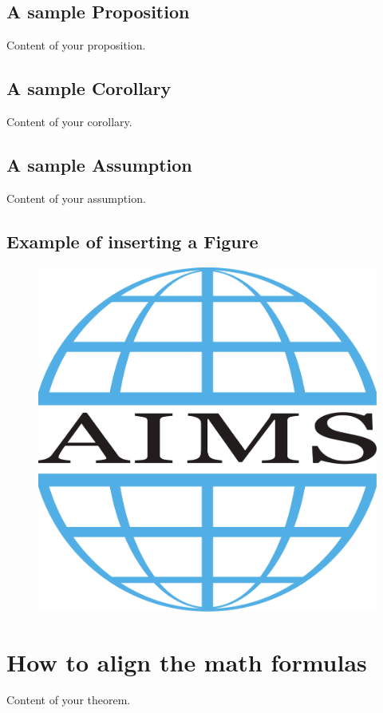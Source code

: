 \documentclass{main}
\begin{document}
\subsection{A sample Proposition}
\begin{proposition}
Content of your proposition.
\end{proposition}

\subsection{A sample Corollary}
\begin{corollary}
Content of your corollary.
\end{corollary}

\subsection{A sample Assumption}
\begin{assumption}
Content of your assumption.
\end{assumption}

\subsection{Example of inserting a Figure}
\begin{figure}[htbp]
  \centering
  \includegraphics[width=.35\linewidth]{AIMS_Logo.pdf}
\end{figure}

\section{How to align the math formulas}
\begin{theorem} \label{result2}
  Content of your theorem.
\end{theorem}
\end{document}
